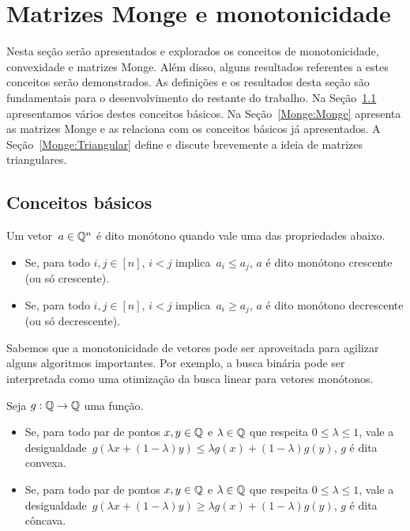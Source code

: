 \chapter{Matrizes Monge e monotonicidade}
\label{Monge}


Nesta seção serão apresentados e explorados os conceitos de monotonicidade, convexidade e matrizes Monge. Além disso, alguns resultados referentes a estes conceitos serão demonstrados. As definições e os resultados desta seção são fundamentais para o desenvolvimento do restante do trabalho.  Na Seção~\ref{Monge:Basic} apresentamos vários destes conceitos básicos. Na Seção~\ref{Monge:Monge} apresenta as matrizes Monge e as relaciona com os conceitos básicos já apresentados. A Seção~\ref{Monge:Triangular} define e discute brevemente a ideia de matrizes triangulares.


\section{Conceitos básicos} \label{Monge:Basic}

\begin{defi}
Um vetor~${ a \in \mathbb{Q}^n }$ é dito monótono quando vale uma das propriedades abaixo.
\begin{itemize}
    \item Se, para todo $i,j \in [n]$, $i < j$ implica~$a_i \leq a_j$, $a$ é dito monótono crescente (ou só crescente).
    \item Se, para todo $i,j \in [n]$, $i < j$ implica~$a_i \geq a_j$, $a$ é dito monótono decrescente (ou só decrescente).
\end{itemize}
\end{defi}

Sabemos que a monotonicidade de vetores pode ser aproveitada para agilizar alguns algoritmos importantes. Por exemplo, a busca binária pode ser interpretada como uma otimização da busca linear para vetores monótonos. 

\begin{defi}
Seja $g : \mathbb{Q} \to \mathbb{Q}$ uma função.
\begin{itemize}
    \item Se, para todo par de pontos $x,y \in \mathbb{Q}$ e $\lambda \in \mathbb{Q}$ que respeita $0 \leq \lambda \leq 1$, vale a desigualdade~${g(\lambda x + (1 - \lambda)y) \leq \lambda g(x) + (1 - \lambda) g(y)}$, $g$ é dita convexa.
    \item Se, para todo par de pontos $x,y \in \mathbb{Q}$ e $\lambda \in \mathbb{Q}$ que respeita $0 \leq \lambda \leq 1$, vale a desigualdade~${g(\lambda x + (1 - \lambda)y) \geq \lambda g(x) + (1 - \lambda) g(y)}$, $g$ é dita côncava.
\end{itemize}
\end{defi}

